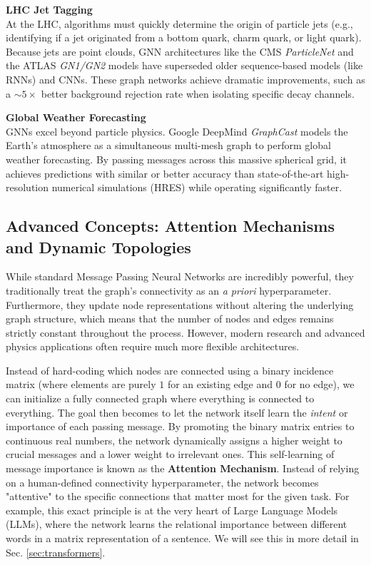 \textbf{LHC Jet Tagging} \\
At the LHC, algorithms must quickly determine the origin of particle jets (e.g., identifying if a jet originated from a bottom quark, charm quark, or light quark). Because jets are point clouds, GNN architectures like the CMS \textit{ParticleNet} and the ATLAS \textit{GN1/GN2} models have superseded older sequence-based models (like RNNs) and CNNs. These graph networks achieve dramatic improvements, such as a $\sim 5\times$ better background rejection rate when isolating specific decay channels.

\textbf{Global Weather Forecasting}\\
GNNs excel beyond particle physics. Google DeepMind \textit{GraphCast} models the Earth's atmosphere as a simultaneous multi-mesh graph to perform global weather forecasting. By passing messages across this massive spherical grid, it achieves predictions with similar or better accuracy than state-of-the-art high-resolution numerical simulations (HRES) while operating significantly faster.

\subsection{Advanced Concepts: Attention Mechanisms and Dynamic Topologies}\label{sec:intro_att_mech}
While standard Message Passing Neural Networks are incredibly powerful, they traditionally treat the graph's connectivity as an \textit{a priori} hyperparameter. Furthermore, they update node representations without altering the underlying graph structure, which means that the number of nodes and edges remains strictly constant throughout the process. However, modern research and advanced physics applications often require much more flexible architectures.

Instead of hard-coding which nodes are connected using a binary incidence matrix (where elements are purely $1$ for an existing edge and $0$ for no edge), we can initialize a fully connected graph where everything is connected to everything. The goal then becomes to let the network itself learn the \textit{intent} or importance of each passing message. By promoting the binary matrix entries to continuous real numbers, the network dynamically assigns a higher weight to crucial messages and a lower weight to irrelevant ones. This self-learning of message importance is known as the \textbf{Attention Mechanism}. Instead of relying on a human-defined connectivity hyperparameter, the network becomes "attentive" to the specific connections that matter most for the given task. For example, this exact principle is at the very heart of Large Language Models (LLMs), where the network learns the relational importance between different words in a matrix representation of a sentence. We will see this in more detail in Sec. \ref{sec:transformers}.

